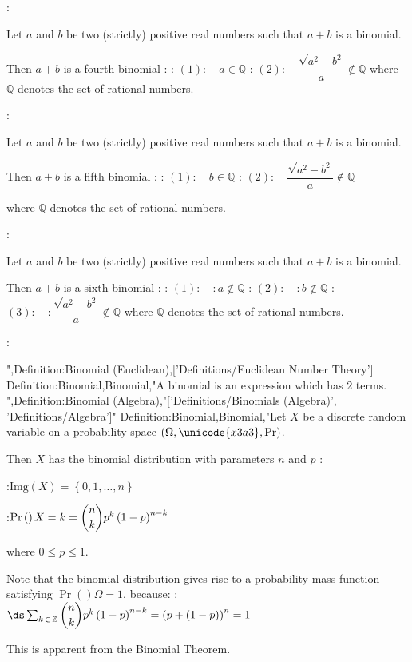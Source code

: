 :

Let $a$ and $b$ be two (strictly) positive real numbers such that $a + b$ is a binomial.


Then $a + b$ is a fourth binomial :
: $(1): \quad a \in \mathbb Q$
: $(2): \quad \dfrac {\sqrt {a^2 - b^2}} a \notin \mathbb Q$
where $\mathbb Q$ denotes the set of rational numbers.



:

Let $a$ and $b$ be two (strictly) positive real numbers such that $a + b$ is a binomial.


Then $a + b$ is a fifth binomial :
: $(1): \quad b \in \mathbb Q$
: $(2): \quad \dfrac {\sqrt {a^2 - b^2}} a \notin \mathbb Q$

where $\mathbb Q$ denotes the set of rational numbers.



:

Let $a$ and $b$ be two (strictly) positive real numbers such that $a + b$ is a binomial.


Then $a + b$ is a sixth binomial :
: $(1): \quad: a \notin \mathbb Q$
: $(2): \quad: b \notin \mathbb Q$
: $(3): \quad: \dfrac {\sqrt {a^2 - b^2}} a \notin \mathbb Q$
where $\mathbb Q$ denotes the set of rational numbers.



:

",Definition:Binomial (Euclidean),['Definitions/Euclidean Number Theory']
Definition:Binomial,Binomial,"A binomial is an expression which has $2$ terms.
",Definition:Binomial (Algebra),"['Definitions/Binomials (Algebra)', 'Definitions/Algebra']"
Definition:Binomial,Binomial,"Let $X$ be a discrete random variable on a probability space $\left( \Omega, \unicode{x3a3}, \Pr \right)$.


Then $X$ has the binomial distribution with parameters $n$ and $p$ :

:$\mathrm {Img} \left( X \right) = \left\lbrace 0, 1, \ldots, n \right\rbrace$

:$\Pr \left(   \right){X = k} = \dbinom n k p^k \left( 1 - p \right)^{n - k}$

where $0 \le p \le 1$.


Note that the binomial distribution gives rise to a probability mass function satisfying $\Pr \left(   \right)\Omega = 1$, because:
:$\ds \sum_{k \mathop \in \mathbb Z} \dbinom n k p^k \left( 1 - p \right)^{n - k} = \left( p + \left( 1 - p \right)  \right)^n = 1$

This is apparent from the Binomial Theorem.


